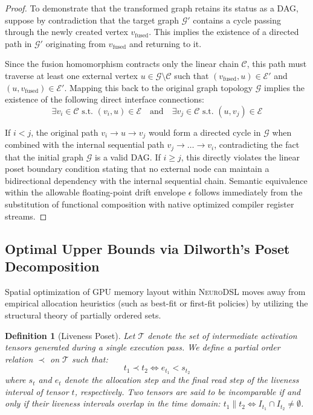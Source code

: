 \documentclass{article}
\newtheorem{definition}{Definition}
\begin{document}
\begin{proof}
To demonstrate that the transformed graph retains its status as a DAG, suppose by contradiction that the target graph $\mathcal{G}'$ contains a cycle passing through the newly created vertex $v_{\text{fused}}$. This implies the existence of a directed path in $\mathcal{G}'$ originating from $v_{\text{fused}}$ and returning to it.

Since the fusion homomorphism contracts only the linear chain $\mathcal{C}$, this path must traverse at least one external vertex $u \in \mathcal{G} \setminus \mathcal{C}$ such that $(v_{\text{fused}}, u) \in \mathcal{E}'$ and $(u, v_{\text{fused}}) \in \mathcal{E}'$. Mapping this back to the original graph topology $\mathcal{G}$ implies the existence of the following direct interface connections:
\begin{equation}
\exists v_i \in \mathcal{C} \text{ s.t. } (v_i, u) \in \mathcal{E} \quad \text{and} \quad \exists v_j \in \mathcal{C} \text{ s.t. } (u, v_j) \in \mathcal{E}
\end{equation}

If $i < j$, the original path $v_i \to u \to v_j$ would form a directed cycle in $\mathcal{G}$ when combined with the internal sequential path $v_j \to \dots \to v_i$, contradicting the fact that the initial graph $\mathcal{G}$ is a valid DAG. If $i \ge j$, this directly violates the linear poset boundary condition stating that no external node can maintain a bidirectional dependency with the internal sequential chain. Semantic equivalence within the allowable floating-point drift envelope $\epsilon$ follows immediately from the substitution of functional composition with native optimized compiler register streams.
\end{proof}

\subsection{Optimal Upper Bounds via Dilworth's Poset Decomposition}

Spatial optimization of GPU memory layout within \textsc{NeuroDSL} moves away from empirical allocation heuristics (such as best-fit or first-fit policies) by utilizing the structural theory of partially ordered sets.

\begin{definition}[Liveness Poset]
Let $\mathcal{T}$ denote the set of intermediate activation tensors generated during a single execution pass. We define a partial order relation $\prec$ on $\mathcal{T}$ such that:
\begin{equation}
t_1 \prec t_2 \iff e_{t_1} < s_{t_2}
\end{equation}
where $s_t$ and $e_t$ denote the allocation step and the final read step of the liveness interval of tensor $t$, respectively. Two tensors are said to be incomparable if and only if their liveness intervals overlap in the time domain: $t_1 \parallel t_2 \iff I_{t_1} \cap I_{t_2} \neq \emptyset$.
\end{definition}
\end{document}
